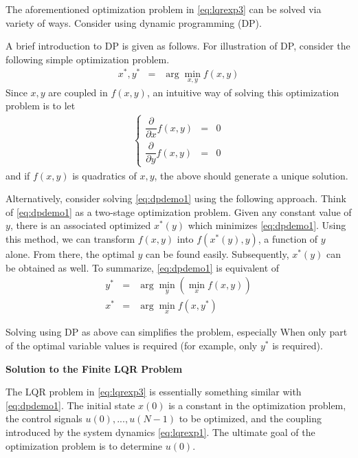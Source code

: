 The aforementioned optimization problem in \eqref{eq:lqrexp3} can be solved via variety of ways. Consider using dynamic programming (DP).

A brief introduction to DP is given as follows. For illustration of DP, consider the following simple optimization problem.
\begin{eqnarray}
  x^*, y^* &=& \arg\min_{x,y} f(x, y) \label{eq:dpdemo1}
\end{eqnarray}
Since $x,y$ are coupled in $f(x,y)$, an intuitive way of solving this optimization problem is to let
\begin{eqnarray}
\left\{\begin{array}{ccc}
         \dfrac{\partial}{\partial x}f(x,y) & = & 0 \\
         \dfrac{\partial}{\partial y}f(x,y) & = & 0
       \end{array}\right. \nonumber
\end{eqnarray}
and if $f(x,y)$ is quadratics of $x, y$, the above should generate a unique solution.

Alternatively, consider solving \eqref{eq:dpdemo1} using the following approach. Think of \eqref{eq:dpdemo1} as a two-stage optimization problem. Given any constant value of $y$, there is an associated optimized $x^*(y)$ which minimizes \eqref{eq:dpdemo1}. Using this method, we can transform $f(x,y)$ into $f\left(x^*(y), y\right)$, a function of $y$ alone. From there, the optimal $y$ can be found easily. Subsequently, $x^*(y)$ can be obtained as well. To summarize, \eqref{eq:dpdemo1} is equivalent of
\begin{eqnarray}
y^* &=& \arg\min_{y}\left(\min_{x}f(x,y)\right) \nonumber \\
x^* &=& \arg\min_{x} f(x, y^*) \nonumber
\end{eqnarray}

Solving using DP as above can simplifies the problem, especially When only part of the optimal variable values is required (for example, only $y^*$ is required).

\vspace{0.1in}
\noindent \textbf{Solution to the Finite LQR Problem}
\vspace{0.1in}

The LQR problem in \eqref{eq:lqrexp3} is essentially something similar with \eqref{eq:dpdemo1}. The initial state $x(0)$ is a constant in the optimization problem, the control signals $u(0), ..., u(N-1)$ to be optimized, and the coupling introduced by the system dynamics \eqref{eq:lqrexp1}. The ultimate goal of the optimization problem is to determine $u(0)$.

